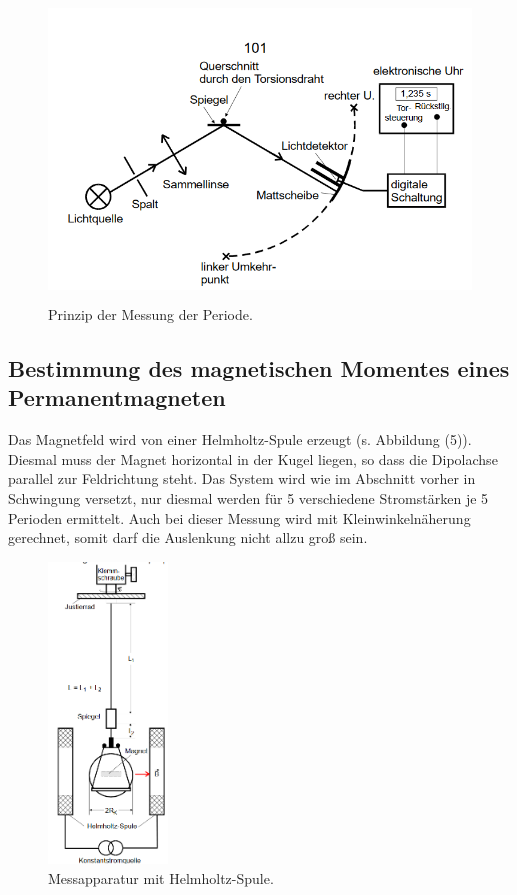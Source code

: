 \begin{figure}[H]
 \centering
  \includegraphics[height=8cm]{Screenshot (11).png}
  \caption{Prinzip der Messung der Periode.}
  \label{fig:drill}
\end{figure}



\subsection{Bestimmung des magnetischen Momentes eines Permanentmagneten}
Das Magnetfeld wird von einer Helmholtz-Spule erzeugt (s. Abbildung (5)).
Diesmal muss der Magnet horizontal in der Kugel liegen, so dass die Dipolachse parallel zur Feldrichtung steht. Das System wird wie im Abschnitt vorher in Schwingung versetzt, nur diesmal werden für 5 verschiedene Stromstärken je 5 Perioden ermittelt.
Auch bei dieser Messung wird mit Kleinwinkelnäherung gerechnet, somit darf die Auslenkung nicht allzu groß sein.

\begin{figure}[H]
 \centering
  \includegraphics[height=8cm]{Screenshot (12).png}
  \caption{Messapparatur mit Helmholtz-Spule.}
  \label{fig:drill}
\end{figure}